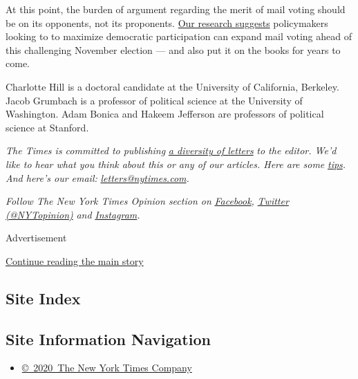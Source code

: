 At this point, the burden of argument regarding the merit of mail voting
should be on its opponents, not its proponents.
\href{https://www.dropbox.com/s/8n4zjvgmytim1rv/Bonica_Grumbach_Hill_Jefferson_Mail_Voting.pdf?raw=1}{Our
research suggests} policymakers looking to to maximize democratic
participation can expand mail voting ahead of this challenging November
election --- and also put it on the books for years to come.

Charlotte Hill is a doctoral candidate at the University of California,
Berkeley. Jacob Grumbach is a professor of political science at the
University of Washington. Adam Bonica and Hakeem Jefferson are
professors of political science at Stanford.

\emph{The Times is committed to publishing}
\href{https://www.nytimes.com/2019/01/31/opinion/letters/letters-to-editor-new-york-times-women.html}{\emph{a
diversity of letters}} \emph{to the editor. We'd like to hear what you
think about this or any of our articles. Here are some}
\href{https://help.nytimes.com/hc/en-us/articles/115014925288-How-to-submit-a-letter-to-the-editor}{\emph{tips}}\emph{.
And here's our email:}
\href{mailto:letters@nytimes.com}{\emph{letters@nytimes.com}}\emph{.}

\emph{Follow The New York Times Opinion section on}
\href{https://www.facebook.com/nytopinion}{\emph{Facebook}}\emph{,}
\href{http://twitter.com/NYTOpinion}{\emph{Twitter (@NYTopinion)}}
\emph{and}
\href{https://www.instagram.com/nytopinion/}{\emph{Instagram}}\emph{.}

Advertisement

\protect\hyperlink{after-bottom}{Continue reading the main story}

\hypertarget{site-index}{%
\subsection{Site Index}\label{site-index}}

\hypertarget{site-information-navigation}{%
\subsection{Site Information
Navigation}\label{site-information-navigation}}

\begin{itemize}
\tightlist
\item
  \href{https://help.nytimes.com/hc/en-us/articles/115014792127-Copyright-notice}{©~2020~The
  New York Times Company}
\end{itemize}

